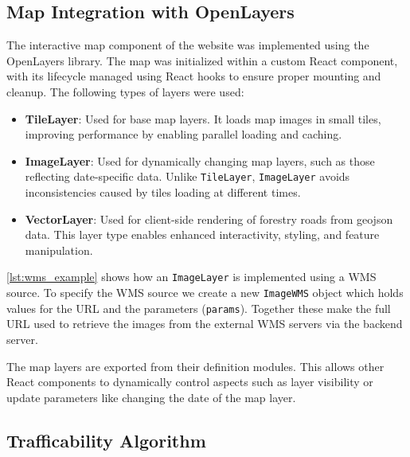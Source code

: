 \subsection{Map Integration with OpenLayers}

The interactive map component of the website was implemented using the OpenLayers library. The map was initialized within a custom React component, with its lifecycle managed using React hooks to ensure proper mounting and cleanup. The following types of layers were used:

\begin{itemize}
    \item \textbf{TileLayer}: Used for base map layers. It loads map images in small tiles, improving performance by enabling parallel loading and caching.
    \item \textbf{ImageLayer}: Used for dynamically changing map layers, such as those reflecting date-specific data. Unlike \texttt{TileLayer}, \texttt{ImageLayer} avoids inconsistencies caused by tiles loading at different times.
    \item \textbf{VectorLayer}: Used for client-side rendering of forestry roads from \gls{geojson} data. This layer type enables enhanced interactivity, styling, and feature manipulation.
\end{itemize}

\autoref{lst:wms_example} shows how an \texttt{ImageLayer} is implemented using a WMS source. To specify the WMS source we create a new \texttt{ImageWMS} object which holds values for the URL and the parameters (\texttt{params}). Together these make the full URL used to retrieve the images from the external WMS servers via the backend server.

The map layers are exported from their definition modules. This allows other React components to dynamically control aspects such as layer visibility or update parameters like changing the date of the map layer.

\begin{figure}[h]

\end{figure}

\subsection{Trafficability Algorithm}\label{subsec:implementation:website:trafficability_algorithm}

